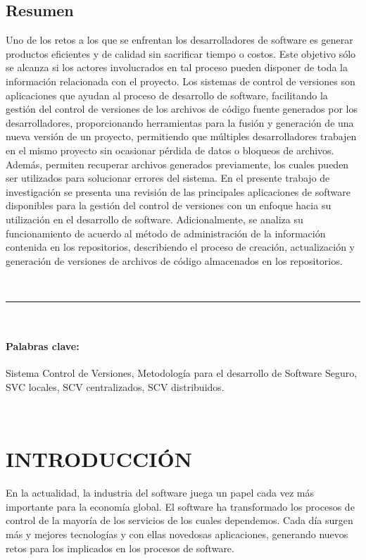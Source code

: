\documentclass[a4paper,12pt]{article}
\begin{document}
{\subsection*{Resumen}

Uno de los retos a los que se enfrentan los desarrolladores de software es generar productos eficientes y de calidad sin sacrificar tiempo o costos. Este objetivo sólo se alcanza si los actores involucrados en tal proceso pueden disponer de toda la información relacionada con el proyecto. Los sistemas de control de versiones son aplicaciones que ayudan al proceso de desarrollo de software, facilitando la gestión del control de versiones de los archivos de código fuente generados por los desarrolladores, proporcionando herramientas para la fusión y generación de una nueva versión de un proyecto, permitiendo que múltiples desarrolladores trabajen en el mismo proyecto sin ocasionar pérdida de datos o bloqueos de archivos. Además, permiten recuperar archivos generados previamente, los cuales pueden ser utilizados para solucionar errores del sistema. En el presente trabajo de investigación se presenta una revisión de las principales aplicaciones de software disponibles para la gestión del control de versiones con un enfoque hacia su utilización en el desarrollo de software. Adicionalmente, se analiza su funcionamiento de acuerdo al método de administración de la información contenida en los repositorios, describiendo el proceso de creación, actualización y generación de versiones de archivos de código almacenados en los repositorios.
\vspace{1cm}
\ %

\
\hrule
\
\

\paragraph{Palabras clave:} Sistema Control de Versiones, Metodología para el desarrollo de Software Seguro, SVC locales, SCV centralizados, SCV distribuidos.

\
\newpage
\tableofcontents
\newpage



\section{INTRODUCCIÓN}
\vspace{1.5cm}

En la actualidad, la industria del software juega un  papel cada vez más importante para la economía
global. El software ha transformado los procesos de control de la mayoría de los servicios de los cuales dependemos. Cada día surgen más y mejores tecnologías y con ellas novedosas aplicaciones,
generando nuevos retos para los implicados en los procesos de software.

}
\end{document}
